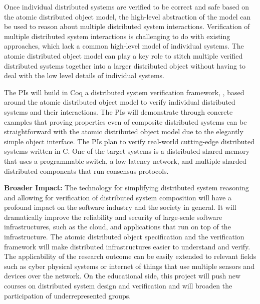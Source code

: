 Once individual distributed systems are verified to be correct and
safe based on the atomic distributed object model, the high-level
abstraction of the model can be used to reason about multiple
distributed system interactions. Verification of multiple distributed
system interactions is challenging to do with existing approaches,
which lack a common high-level model of individual systems.  The
atomic distributed object model can play a key role to stitch multiple
verified distributed systems together into a larger distributed object
without having to deal with the low level details of individual
systems.

The PIs will build in Coq a distributed system verification
framework, \sysname{}, based around the atomic distributed object
model to verify individual distributed systems and their interactions.
The PIs will demonstrate through concrete examples that proving
properties even of composite distributed systems can be
straightforward with the atomic distributed object model due to the
elegantly simple object interface.  The PIs plan to verify real-world
cutting-edge distributed systems written in C.  One of the target
systems is a distributed shared memory that uses a programmable
switch, a low-latency network, and multiple sharded distributed
components that run consensus protocols.


{\bf Broader Impact:} The technology for simplifying distributed
system reasoning and allowing for verification of distributed system
composition will have a profound impact on the software industry and
the society in general. It will dramatically improve the reliability
and security of large-scale software infrastructures, such as the
cloud, and applications that run on top of the infrastructure.  The
atomic distributed object specification and the verification framework
will make distributed infrastructures easier to understand and verify.
The applicability of the research outcome can be easily extended to
relevant fields such as cyber physical systems or internet of things
that use multiple sensors and devices over the network.  On the
educational side, this project will push new courses on distributed
system design and verification and will broaden the participation of
underrepresented groups.

